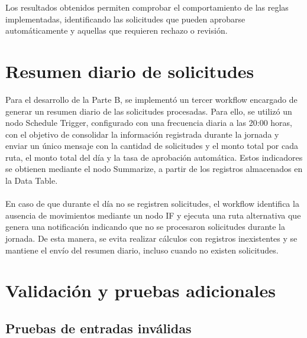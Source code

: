 \documentclass[12pt,a4paper]{article}
\begin{document}
\noindent Los resultados obtenidos permiten comprobar el comportamiento de las reglas implementadas, identificando las solicitudes que pueden aprobarse automáticamente y aquellas que requieren rechazo o revisión.

\section{Resumen diario de solicitudes}

\noindent Para el desarrollo de la Parte B, se implementó un tercer workflow encargado de generar un resumen diario de las solicitudes procesadas. Para ello, se utilizó un nodo Schedule Trigger, configurado con una frecuencia diaria a las 20:00 horas, con el objetivo de consolidar la información registrada durante la jornada y enviar un único mensaje con la cantidad de solicitudes y el monto total por cada ruta, el monto total del día y la tasa de aprobación automática. Estos indicadores se obtienen mediante el nodo Summarize, a partir de los registros almacenados en la Data Table.
\\\\
\noindent En caso de que durante el día no se registren solicitudes, el workflow identifica la ausencia de movimientos mediante un nodo IF y ejecuta una ruta alternativa que genera una notificación indicando que no se procesaron solicitudes durante la jornada. De esta manera, se evita realizar cálculos con registros inexistentes y se mantiene el envío del resumen diario, incluso cuando no existen solicitudes.

\section{Validación y pruebas adicionales}

\subsection{Pruebas de entradas inválidas}
\end{document}
